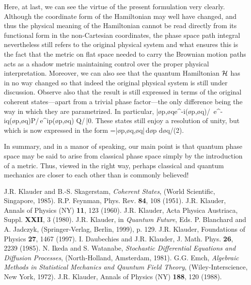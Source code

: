 Here, at last, we can see the virtue of the present formulation very 
clearly. Although the coordinate form of the Hamiltonian may well have 
changed, and thus the physical meaning of the Hamiltonian cannot be read 
directly from its functional form in the non-Cartesian coordinates, the 
phase space path integral nevertheless still refers to the original 
physical system and what ensures this is the fact that the metric on 
flat space needed to carry the Brownian motion paths acts as a shadow 
metric maintaining control over the proper physical interpretation. 
Moreover, we can also see that the quantum Hamiltonian ${\cal H}$ has in no 
way changed so that indeed the original physical system is still under 
discussion. Observe also that the result is still expressed in terms of 
the original coherent states---apart from a trivial phase factor---the 
only difference being the way in which they are parametrized. In particular,
  \bn |{\o p},{\o q}\>\equiv e^{-i({\o p},{\o q})/\hbar}\,
e^{-i\s q({\o p},{\o q})\s P/\hbar}\,e^{i\s p({\o p},{\o q})\s 
Q/\hbar}\,|0\>\;. \en 
These states still enjoy a resolution of unity, but which is now 
expressed in the form
  \bn  \one=\int |{\o p},{\o q}\>,{\o q}|\,d{\o p}\s 
d{\o q}/(2\pi\hbar)\;. \en

In summary, and in a manor of speaking, our main point is that quantum 
phase space may be said to arise from classical phase space simply by 
the introduction of a metric. Thus, viewed in the right way, perhaps 
classical and quantum mechanics are closer to each other than is 
commonly believed!


\begin{thebibliography}{99}
 J.R. Klauder and B.-S. Skagerstam, {\it Coherent States}, 
(World Scientific, Singapore, 1985).
R.P. Feynman, Phys. Rev. {\bf 84}, 108 (1951).
J.R. Klauder, Annals of Physics (NY) {\bf 11}, 123 (1960).
J.R. Klauder, Acta Physica Austriaca, Suppl. {\bf XXII}, 3 
(1980). 
J.R. Klauder, in {\it Quantum Future}, Eds. P. Blanchard and 
A. Jadczyk, (Springer-Verlag, Berlin, 1999), p. 129. 
J.R. Klauder, Foundations of Physics {\bf 27}, 1467 (1997).
I. Daubechies and J.R. Klauder, J. Math. Phys. {\bf 26}, 2239 
(1985). 
N. Ikeda and S. Watanabe, {\it Stochastic Differential 
Equations and Diffusion Processes}, (North-Holland, Amsterdam, 1981).
G.G. Emch, {\it Algebraic Methods in Statistical Mechanics 
and Qauntum Field Theory}, (Wiley-Interscience, New York, 1972).
J.R. Klauder, Annals of Physics (NY) {\bf 188}, 120 (1988).

\end{thebibliography}


 


